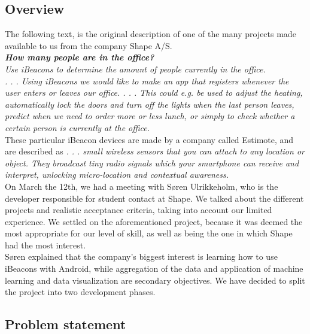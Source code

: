 \documentclass[12pt]{article}
\begin{document}
\subsection{Overview}

The following text, is the original description of one of the many projects made available to us from the company Shape A/S.\\

\textit{\textbf{How many people are in the office?}\\
Use iBeacons to determine the amount of people currently in the office. \\
. . .
Using iBeacons we would like to make an app that registers whenever the user enters or leaves our office. . . . This could e.g. be used to adjust the heating, automatically lock the doors and turn off the lights when the last person leaves, predict when we need to order more or less lunch, or simply to check whether a certain person is currently at the office.} \cite{shape_ws}\\

These particular iBeacon devices are made by a company called Estimote, and are described as \textit{. . . small wireless sensors that you can attach to any location or object. They broadcast tiny radio signals which your smartphone can receive and interpret, unlocking micro-location and contextual awareness.} \cite{estimote_ws}\\

On March the 12th, we had a meeting with S\o ren Ulrikkeholm, who is the developer responsible for student contact at Shape. We talked about the different projects and realistic acceptance criteria, taking into account our limited experience. We settled on the aforementioned project, because it was deemed the most appropriate for our level of skill, as well as being the one in which Shape had the most interest.\\

S\o ren explained that the company's biggest interest is learning how to use iBeacons with Android, while aggregation of the data and application of machine learning and data visualization are secondary objectives. We have decided to split the project into two development phases.\\



\subsection{Problem statement}
\end{document}
